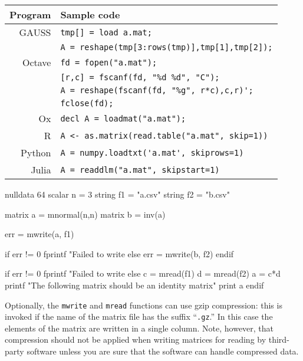 \begin{center}
  \begin{tabular}{rl}
    \textbf{Program} & \textbf{Sample code} \\
    \hline
    GAUSS  & \verb|tmp[] = load a.mat;| \\
    & \verb|A = reshape(tmp[3:rows(tmp)],tmp[1],tmp[2]);| \\
    Octave & \verb|fd = fopen("a.mat");| \\
    & \verb|[r,c] = fscanf(fd, "%d %d", "C");| \\
    & \verb|A = reshape(fscanf(fd, "%g", r*c),c,r)';| \\
    & \verb|fclose(fd);| \\
    Ox     & \verb|decl A = loadmat("a.mat");| \\
    R      & \verb|A <- as.matrix(read.table("a.mat", skip=1))| \\
    Python & \verb|A = numpy.loadtxt('a.mat', skiprows=1)| \\
    Julia  & \verb|A = readdlm("a.mat", skipstart=1)| \\
  \hline
\end{tabular}
\end{center}


\begin{script}[htbp]
  \begin{scode}
nulldata 64
scalar n = 3
string f1 = "a.csv"
string f2 = "b.csv"

matrix a = mnormal(n,n)
matrix b = inv(a)

err = mwrite(a, f1)

if err != 0
  fprintf "Failed to write %
else
  err = mwrite(b, f2)
endif 

if err != 0
  fprintf "Failed to write %
else
  c = mread(f1)
  d = mread(f2)
  a = c*d
  printf "The following matrix should be an identity matrix\n"
  print a
endif
  \end{scode}
\end{script}

Optionally, the \texttt{mwrite} and \texttt{mread} functions can use
gzip compression: this is invoked if the name of the matrix file has
the suffix ``\texttt{.gz}.'' In this case the elements of the matrix
are written in a single column. Note, however, that compression should
not be applied when writing matrices for reading by third-party
software unless you are sure that the software can handle compressed
data.

